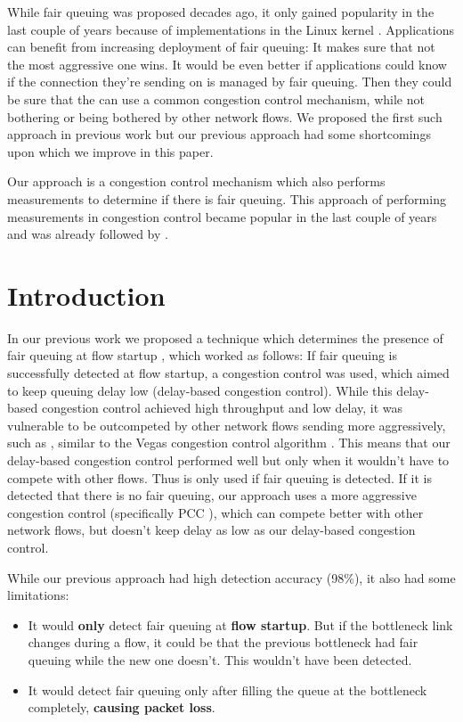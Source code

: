 \documentclass[conference]{IEEEtran}
\begin{document}
While fair queuing was proposed decades ago, it only gained popularity in the last couple of years because of implementations in the Linux kernel \cite{dumazet_pkt_sched_2013,hoeiland-joergensen_flow_2018}. 
Applications can benefit from increasing deployment of fair queuing: It makes sure that not the most aggressive one wins. 
It would be even better if applications could know if the connection they're sending on is managed by fair queuing. Then they could be sure that the can use a common congestion control mechanism, while not bothering or being bothered by other network flows.
We proposed the first such approach in previous work \cite{bachl_detecting_2021} but our previous approach had some shortcomings upon which we improve in this paper. 

Our approach is a congestion control mechanism which also performs measurements to determine if there is fair queuing. 
This approach of performing measurements in congestion control became popular in the last couple of years and was already followed by \cite{cardwell_bbr_2016,dong_pcc_2015,goyal_elasticity_2020,hayes_online_2020}.

\section{Introduction}

In our previous work we proposed a technique which determines the presence of fair queuing at flow startup \cite{bachl_detecting_2021}, which worked as follows: 
If fair queuing is successfully detected at flow startup, a congestion control was used, which aimed to keep queuing delay low (delay-based congestion control). 
While this delay-based congestion control achieved high throughput and low delay, it was vulnerable to be outcompeted by other network flows sending more aggressively, such as \cite{cardwell_bbr_2016,dong_pcc_2015,ha_cubic_2008}, 
similar to the Vegas congestion control algorithm \cite{brakmo_tcp_1995}.
This means that our delay-based congestion control performed well but only when it wouldn't have to compete with other flows. Thus is only used if fair queuing is detected. 
If it is detected that there is no fair queuing, our approach uses a more aggressive congestion control (specifically PCC \cite{dong_pcc_2015}), which can compete better with other network flows,
but doesn't keep delay as low as our delay-based congestion control. 

While our previous approach had high detection accuracy (98\%), it also had some limitations:
\begin{itemize}
    \item It would \textbf{only} detect fair queuing at \textbf{flow startup}. 
    But if the bottleneck link changes during a flow, it could be that the previous bottleneck had fair queuing while the new one doesn't. This wouldn't have been detected. 
    \item It would detect fair queuing only after filling the queue at the bottleneck completely, \textbf{causing packet loss}. 
\end{itemize}
\end{document}
